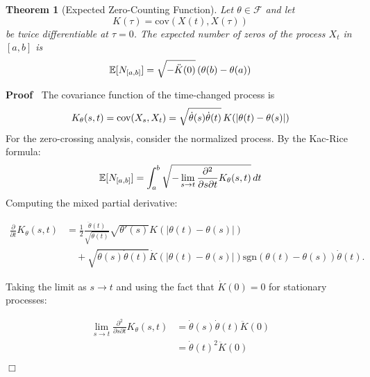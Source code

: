 \documentclass{article}
\newenvironment{proof}{\noindent\textbf{Proof\ }}{\hspace*{\fill}$\Box$\medskip}
\newtheorem{theorem}{Theorem}
\begin{document}
\begin{theorem}
  [Expected Zero-Counting Function]\label{thm:zero_count} Let $\theta \in
  \mathcal{F}$ and let
  \begin{equation}
    K (\tau) = \mathrm{cov} (X (t), X (\tau))
  \end{equation}
  be twice differentiable at $\tau = 0$. The expected number of zeros of the
  process $X_t$ in $[a, b]$ is
  \begin{equation}
    \label{eq:zero_count} \mathbb{E} [N_{[a, b]}] = \sqrt{- \ddot{K} (0)} 
    \hspace{0.17em} (\theta (b) - \theta (a))
  \end{equation}
\end{theorem}

\begin{proof}
  The covariance function of the time-changed process is
  \begin{equation}
    \label{eq:time_changed_cov} K_{\theta} (s, t) = \mathrm{cov} (X_s, X_t) =
    \sqrt{\dot{\theta} (s)  \dot{\theta} (t)}  \hspace{0.17em} K (| \theta (t)
    - \theta (s) |)
  \end{equation}
  For the zero-crossing analysis, consider the normalized process. By the
  Kac-Rice formula:
  \begin{equation}
    \label{eq:kac_rice} \mathbb{E} [N_{[a, b]}] = \int_a^b \sqrt{- \lim_{s \to
    t}  \frac{\partial^2}{\partial s \partial t} K_{\theta} (s, t)} 
    \hspace{0.17em} dt
  \end{equation}
  Computing the mixed partial derivative:
  
  \begin{align}
    \frac{\partial}{\partial t} K_{\theta} (s, t) & = \frac{1}{2} 
    \frac{\ddot{\theta} (t)}{\sqrt{\dot{\theta} (t)}}  \sqrt{\theta' (s)} K (|
    \theta (t) - \theta (s) |) \\
    & \quad + \sqrt{\dot{\theta} (s)  \dot{\theta} (t)}  \dot{K} (| \theta
    (t) - \theta (s) |) \mathrm{sgn} (\theta (t) - \theta (s))  \dot{\theta}
    (t) . 
  \end{align}
  
  Taking the limit as $s \to t$ and using the fact that $\dot{K} (0) = 0$ for
  stationary processes:
  
  \begin{align}
    \lim_{s \to t}  \frac{\partial^2}{\partial s \partial t} K_{\theta} (s, t)
    & = \dot{\theta} (s)  \dot{\theta} (t)  \ddot{K} (0) \\
    & = \dot{\theta} (t)^2  \ddot{K} (0) 
  \end{align}
  

\end{proof}
\end{document}
